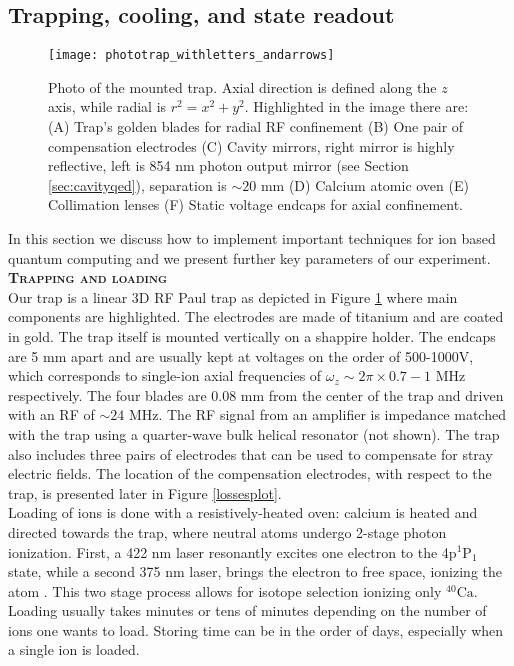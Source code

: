 \subsection{Trapping, cooling, and state readout}
\label{sec:expparameters}
\begin{figure}
\centering
\texttt{[image: phototrap\_withletters\_andarrows]}
\caption{Photo of the mounted trap. Axial direction is defined along the $z$ axis, while radial is $r^2 = x^2 + y^2$. Highlighted in the image there are: (A) Trap's golden blades for radial RF confinement (B) One pair of compensation electrodes (C) Cavity mirrors, right mirror is highly reflective, left is 854 nm photon output mirror (see Section \ref{sec:cavityqed}), separation is $\sim 20$ mm (D) Calcium atomic oven (E) Collimation lenses (F) Static voltage endcaps for axial confinement.}
\label{trapphoto}
\end{figure}
In this section we discuss how to implement important techniques for ion based quantum computing and we present further key parameters of our experiment.\vspace{.5em}\\
\textbf{\textsc{Trapping and loading}}\\
Our trap is a linear 3D RF Paul trap as depicted in Figure \ref{trapphoto} where main components are highlighted. The electrodes are made of titanium and are coated in gold. The trap itself is mounted vertically on a shappire holder. The endcaps are 5 mm apart and are usually kept at voltages on the order of 500-1000V, which corresponds to single-ion axial frequencies of $\omega_z \sim 2\pi \times 0.7-1$ MHz respectively. The four blades are 0.08 mm from the center of the trap and driven with an RF of $\sim 24$ MHz. The RF signal from an amplifier is impedance matched with the trap using a quarter-wave bulk helical resonator (not shown). The trap also includes three pairs of electrodes that can be used to compensate for stray electric fields. The location of the compensation electrodes, with respect to the trap, is presented later in Figure \ref{lossesplot}.\\
Loading of ions is done with a resistively-heated oven: calcium is heated and directed towards the trap, where neutral atoms undergo 2-stage photon ionization. First, a 422 nm laser resonantly excites one electron to the 4p$^1\text{P}_1$ state, while a second 375 nm laser, brings the electron to free space, ionizing the atom \cite{Gulde2001}. This two stage process allows for isotope selection ionizing only $^{40}\text{Ca}$. Loading usually takes minutes or tens of minutes depending on the number of ions one wants to load. Storing time can be in the order of days, especially when a single ion is loaded.\vspace{.5em}\\
